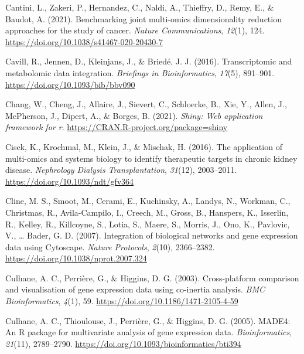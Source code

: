 \documentclass[a4paper, nobind]{templates/ociamthesis}
\newlength{\cslhangindent}
\newenvironment{CSLReferences}[2] %
 {%
  \setlength{\parindent}{0pt}
  \ifodd #1
  \let\oldpar\par
  \def\par{\hangindent=\cslhangindent\oldpar}
  \fi
  \setlength{\parskip}{1mm}
  \setlength{\baselineskip}{6mm}
 }%
 {}
\begin{document}
\begin{CSLReferences}{1}{0}
\leavevmode{}%
Cantini, L., Zakeri, P., Hernandez, C., Naldi, A., Thieffry, D., Remy, E., \& Baudot, A. (2021). Benchmarking joint multi-omics dimensionality reduction approaches for the study of cancer. \emph{Nature Communications}, \emph{12}(1), 124. \url{https://doi.org/10.1038/s41467-020-20430-7}

\leavevmode{}%
Cavill, R., Jennen, D., Kleinjans, J., \& Briedé, J. J. (2016). Transcriptomic and metabolomic data integration. \emph{Briefings in Bioinformatics}, \emph{17}(5), 891--901. \url{https://doi.org/10.1093/bib/bbv090}

\leavevmode{}%
Chang, W., Cheng, J., Allaire, J., Sievert, C., Schloerke, B., Xie, Y., Allen, J., McPherson, J., Dipert, A., \& Borges, B. (2021). \emph{Shiny: Web application framework for r}. \url{https://CRAN.R-project.org/package=shiny}

\leavevmode{}%
Cisek, K., Krochmal, M., Klein, J., \& Mischak, H. (2016). The application of multi-omics and systems biology to identify therapeutic targets in chronic kidney disease. \emph{Nephrology Dialysis Transplantation}, \emph{31}(12), 2003--2011. \url{https://doi.org/10.1093/ndt/gfv364}

\leavevmode{}%
Cline, M. S., Smoot, M., Cerami, E., Kuchinsky, A., Landys, N., Workman, C., Christmas, R., Avila-Campilo, I., Creech, M., Gross, B., Hanspers, K., Isserlin, R., Kelley, R., Killcoyne, S., Lotia, S., Maere, S., Morris, J., Ono, K., Pavlovic, V., \ldots{} Bader, G. D. (2007). Integration of biological networks and gene expression data using {Cytoscape}. \emph{Nature Protocols}, \emph{2}(10), 2366--2382. \url{https://doi.org/10.1038/nprot.2007.324}

\leavevmode{}%
Culhane, A. C., Perrière, G., \& Higgins, D. G. (2003). Cross-platform comparison and visualisation of gene expression data using co-inertia analysis. \emph{BMC Bioinformatics}, \emph{4}(1), 59. \url{https://doi.org/10.1186/1471-2105-4-59}

\leavevmode{}%
Culhane, A. C., Thioulouse, J., Perrière, G., \& Higgins, D. G. (2005). {MADE4}: An {R} package for multivariate analysis of gene expression data. \emph{Bioinformatics}, \emph{21}(11), 2789--2790. \url{https://doi.org/10.1093/bioinformatics/bti394}


\end{CSLReferences}
\end{document}
